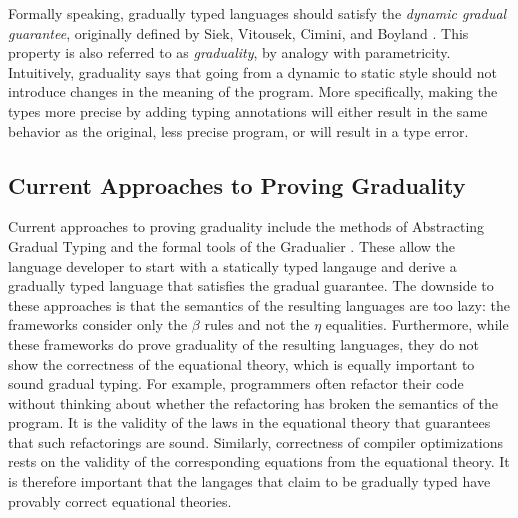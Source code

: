 Formally speaking, gradually typed languages should satisfy the 
\emph{dynamic gradual guarantee}, originally defined by Siek, Vitousek, Cimini,
and Boyland \cite{siek_et_al:LIPIcs:2015:5031}.
This property is also referred to as \emph{graduality}, by analogy with parametricity.
Intuitively, graduality says that going from a dynamic to static style should not
introduce changes in the meaning of the program.
More specifically, making the types more precise by adding typing annotations
will either result in the same behavior as the original, less precise program,
or will result in a type error.


\subsection{Current Approaches to Proving Graduality}
Current approaches to proving graduality include the methods of Abstracting Gradual Typing
\cite{garcia-clark-tanter2016} and the formal tools of the Gradualier \cite{cimini-siek2016}.
These allow the language developer to start with a statically typed langauge and derive a
gradually typed language that satisfies the gradual guarantee. The downside to these approaches
is that the semantics of the resulting languages are too lazy: the frameworks consider only
the $\beta$ rules and not the $\eta$ equalities. Furthermore, while these frameworks do prove
graduality of the resulting languages, they do not show the correctness of the equational theory,
which is equally important to sound gradual typing. For example, programmers often refactor their
code without thinking about whether the refactoring has broken the semantics of the program. 
It is the validity of the laws in the equational theory that guarantees that such refactorings are sound. 
Similarly, correctness of compiler optimizations rests on the validity of the corresponding equations
from the equational theory. It is therefore important that the langages that claim to be gradually typed
have provably correct equational theories.


